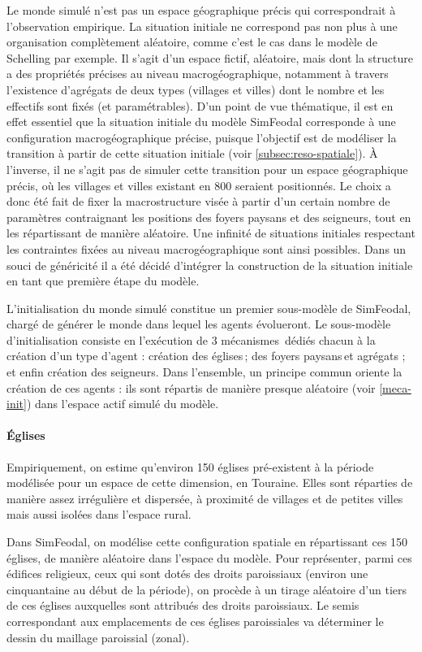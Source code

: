 Le \og monde\fg{} simulé n'est pas un espace géographique précis qui correspondrait à l'observation empirique.
La situation initiale ne correspond pas non plus à une organisation complètement aléatoire, comme c'est le cas dans le modèle de Schelling par exemple.
Il s'agit d'un espace fictif, aléatoire, mais dont la structure a des propriétés précises au niveau macrogéographique, notamment à travers l'existence d’agrégats de deux types (villages et villes) dont le nombre et les effectifs sont fixés (et paramétrables).
D'un point de vue thématique, il est en effet essentiel que la situation initiale du modèle SimFeodal corresponde à une configuration macrogéographique précise, puisque l'objectif est de modéliser la transition à partir de cette situation initiale (voir \cref{subsec:reso-spatiale}).
À l'inverse, il ne s'agit pas de simuler cette transition pour un espace géographique précis, où les villages et villes existant en 800 seraient positionnés.
Le choix a donc été fait de fixer la macrostructure visée à partir d'un certain nombre de paramètres contraignant les positions des foyers paysans et des seigneurs, tout en les répartissant de manière aléatoire.
Une infinité de situations initiales respectant les contraintes fixées au niveau macrogéographique sont ainsi possibles.
Dans un souci de généricité il a été décidé d'intégrer la construction de la situation initiale en tant que première étape du modèle.

L'initialisation du monde simulé constitue un premier \og sous-modèle\fg{} de SimFeodal, chargé de générer le monde dans lequel les agents évolueront.
Le sous-modèle d'initialisation consiste en l'exécution de 3 mécanismes dédiés chacun à la création d'un type d'agent : création des églises ; des foyers paysans et agrégats ; et enfin création des seigneurs.
Dans l'ensemble, un principe commun oriente la création de ces agents : ils sont répartis de manière presque aléatoire (voir \cref{meca-init}) dans l'espace \og actif\fg{} simulé du modèle.

\paragraph{Églises}
Empiriquement, on estime qu'environ 150 églises pré-existent à la période modélisée pour un espace de cette dimension, en Touraine.
Elles sont réparties de manière assez irrégulière et dispersée, à proximité de villages et de petites villes mais aussi isolées dans l'espace rural.

Dans SimFeodal, on modélise cette configuration spatiale en répartissant ces 150\unskip{} églises, de manière aléatoire dans l'espace du modèle.
Pour représenter, parmi ces édifices religieux, ceux qui sont dotés des droits paroissiaux (environ une cinquantaine au début de la période), on procède à un tirage aléatoire d'un tiers de ces églises auxquelles sont attribués des droits paroissiaux.
Le semis correspondant aux emplacements de ces églises paroissiales va déterminer le dessin du maillage paroissial (zonal).


